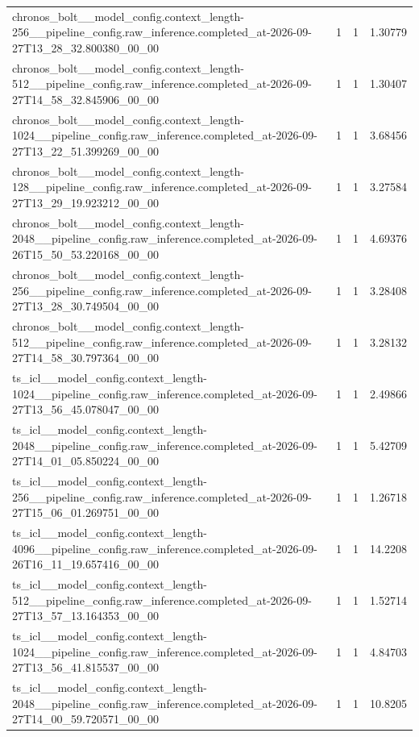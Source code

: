 \begin{tabular}{llll}
chronos\_bolt\_\_model\_config.context\_length-256\_\_pipeline\_config.raw\_inference.completed\_at-2026-09-27T13\_28\_32.800380\_00\_00 & 1 & 1 & 1.30779 \\
chronos\_bolt\_\_model\_config.context\_length-512\_\_pipeline\_config.raw\_inference.completed\_at-2026-09-27T14\_58\_32.845906\_00\_00 & 1 & 1 & 1.30407 \\
chronos\_bolt\_\_model\_config.context\_length-1024\_\_pipeline\_config.raw\_inference.completed\_at-2026-09-27T13\_22\_51.399269\_00\_00 & 1 & 1 & 3.68456 \\
chronos\_bolt\_\_model\_config.context\_length-128\_\_pipeline\_config.raw\_inference.completed\_at-2026-09-27T13\_29\_19.923212\_00\_00 & 1 & 1 & 3.27584 \\
chronos\_bolt\_\_model\_config.context\_length-2048\_\_pipeline\_config.raw\_inference.completed\_at-2026-09-26T15\_50\_53.220168\_00\_00 & 1 & 1 & 4.69376 \\
chronos\_bolt\_\_model\_config.context\_length-256\_\_pipeline\_config.raw\_inference.completed\_at-2026-09-27T13\_28\_30.749504\_00\_00 & 1 & 1 & 3.28408 \\
chronos\_bolt\_\_model\_config.context\_length-512\_\_pipeline\_config.raw\_inference.completed\_at-2026-09-27T14\_58\_30.797364\_00\_00 & 1 & 1 & 3.28132 \\
ts\_icl\_\_model\_config.context\_length-1024\_\_pipeline\_config.raw\_inference.completed\_at-2026-09-27T13\_56\_45.078047\_00\_00 & 1 & 1 & 2.49866 \\
ts\_icl\_\_model\_config.context\_length-2048\_\_pipeline\_config.raw\_inference.completed\_at-2026-09-27T14\_01\_05.850224\_00\_00 & 1 & 1 & 5.42709 \\
ts\_icl\_\_model\_config.context\_length-256\_\_pipeline\_config.raw\_inference.completed\_at-2026-09-27T15\_06\_01.269751\_00\_00 & 1 & 1 & 1.26718 \\
ts\_icl\_\_model\_config.context\_length-4096\_\_pipeline\_config.raw\_inference.completed\_at-2026-09-26T16\_11\_19.657416\_00\_00 & 1 & 1 & 14.2208 \\
ts\_icl\_\_model\_config.context\_length-512\_\_pipeline\_config.raw\_inference.completed\_at-2026-09-27T13\_57\_13.164353\_00\_00 & 1 & 1 & 1.52714 \\
ts\_icl\_\_model\_config.context\_length-1024\_\_pipeline\_config.raw\_inference.completed\_at-2026-09-27T13\_56\_41.815537\_00\_00 & 1 & 1 & 4.84703 \\
ts\_icl\_\_model\_config.context\_length-2048\_\_pipeline\_config.raw\_inference.completed\_at-2026-09-27T14\_00\_59.720571\_00\_00 & 1 & 1 & 10.8205 \\

\end{tabular}

